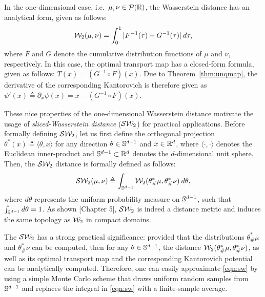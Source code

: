 In the one-dimensional case, i.e.\ $\mu,\nu \in {\cal P}(\mathbb{R})$, the Wasserstein distance has an analytical form, given as follows:
\begin{align}
{\cal W}_2(\mu,\nu) = \int_0^1 |F^{-1}(\tau) - G^{-1}(\tau)| \> d\tau,
\end{align}
where $F$ and $G$ denote the cumulative distribution functions of $\mu$ and $\nu$, respectively. In this case, the optimal transport map has a closed-form formula, given as follows: $T(x) = (G^{-1} \circ F) (x)$. Due to Theorem~\ref{thm:unqmap}, the derivative of the corresponding Kantorovich is therefore given as $\psi'(x) \triangleq \partial_x \psi(x) = x- (G^{-1} \circ F) (x)$.
 
These nice properties of the one-dimensional Wasserstein distance motivate the usage of \emph{sliced-Wasserstein distance} (${\cal S}{\cal W}_2$) for practical applications. Before formally defining ${\cal S}{\cal W}_2$, let us first define the orthogonal projection $\theta^* (x) \triangleq \langle \theta, x \rangle$ for any direction $\theta \in \mathbb{S}^{d-1}$ and $x \in \mathbb{R}^d$, where $\langle \cdot, \cdot \rangle$ denotes the Euclidean inner-product and $\mathbb{S}^{d-1} \subset \mathbb{R}^d$ denotes the $d$-dimensional unit sphere. Then, the ${\cal S}{\cal W}_2$ distance is formally defined as follows:
\begin{align}
{\cal S}{\cal W}_2(\mu,\nu) \triangleq \int_{\mathbb{S}^{d-1}} {\cal W}_2 (\theta^*_\#\mu, \theta^*_\#\nu) \> d \theta, \label{eqn:sw}
\end{align}
where $d\theta$ represents the uniform probability measure on $\mathbb{S}^{d-1}$, such that $\int_{\mathbb{S}^{d-1}} d \theta = 1$. As shown \cite{bonnotte2013unidimensional}[Chapter 5], ${\cal S}{\cal W}_2$ is indeed a distance metric and induces the same topology as ${\cal W}_2$ in compact domains. 

The ${\cal S}{\cal W}_2$ has a strong practical significance: provided that the distributions $\theta^*_\#\mu$ and $\theta^*_\#\nu$ can be computed, then for any $\theta \in \mathbb{S}^{d-1}$, the distance ${\cal W}_2 (\theta^*_\#\mu, \theta^*_\#\nu)$, as well as its optimal transport map and the corresponding Kantorovich potential can be analytically computed. Therefore, one can easily approximate \eqref{eqn:sw} by using a simple Monte Carlo scheme that draws uniform random samples from $\mathbb{S}^{d-1}$ and replaces the integral in \eqref{eqn:sw} with a finite-sample average. 





